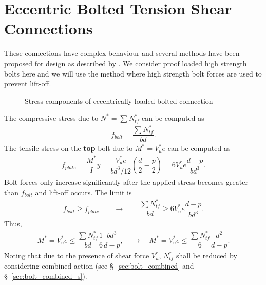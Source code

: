 \section{Eccentric Bolted Tension Shear Connections}
These connections have complex behaviour and several methods have been proposed for design as described by \citet{Smith1996}. We consider proof loaded high strength bolts here and we will use the method \citep{Salmon2009} where high strength bolt forces are used to prevent lift-off.
\begin{figure}[H]
\centering\caption{Stress components of eccentrically loaded bolted connection}
\end{figure}
The compressive stress due to $N^*=\sum{}N^*_{tf}$ can be computed as
\begin{gather}
f_{bolt}=\dfrac{\sum{}N^*_{tf}}{bd}.
\end{gather}
The tensile stress on the \textbf{top} bolt due to $M^*=V_u^*e$ can be computed as
\begin{gather}
f_{plate}=\dfrac{M^*}{I}y=\dfrac{V_u^*e}{bd^3/12}\left(\dfrac{d}{2}-\dfrac{p}{2}\right)=6V_u^*e\dfrac{d-p}{bd^3}.
\end{gather}
Bolt forces only increase significantly after the applied stress becomes greater than $f_{bolt}$ and lift-off occurs. The limit is
\begin{gather*}
f_{bolt}\geqslant{}f_{plate}\qquad\longrightarrow\qquad
\dfrac{\sum{}N^*_{tf}}{bd}\geqslant{}6V_u^*e\dfrac{d-p}{bd^3}.
\end{gather*}
Thus,
\begin{gather}
M^*=V_u^*e\leqslant\dfrac{\sum{}N^*_{tf}}{bd}\dfrac{1}{6}\dfrac{bd^3}{d-p},\quad\longrightarrow\quad
M^*=V_u^*e\leqslant\dfrac{\sum{}N^*_{tf}}{6}\dfrac{d^2}{d-p}.
\end{gather}
Noting that due to the presence of shear force $V_u^*$, $N^*_{tf}$ shall be reduced by considering combined action (see \S~\ref{sec:bolt_combined} and \S~\ref{sec:bolt_combined_s}).
\clearpage
